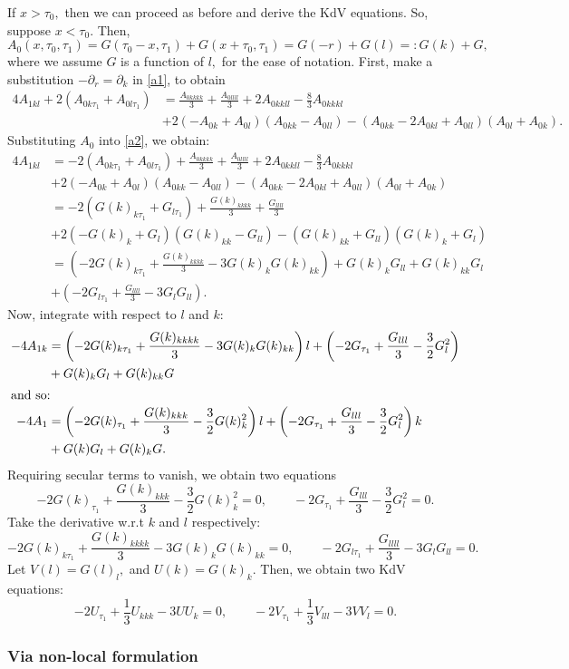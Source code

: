 \documentclass[10pt,reqno,oneside,a4paper]{article}
\begin{document}
If $x > \tau_0,$ then we can proceed as before and derive the KdV equations. So, suppose $x < \tau_0.$ Then, 
\[A_0(x, \tau_0, \tau_1) = G(\tau_0- x, \tau_1) + G(x+\tau_0, \tau_1) = G(-r) + G(l) =: G(k) + G,\]
where we assume $G$ is a function of $l,$ for the ease of notation. First, make a substitution $- \partial_r = \partial_k$ in \eqref{a1}, to obtain 
\begin{equation}\label{a2}
\begin{aligned}
4A_{1kl}  + 2(A_{0 k\tau_{1}} + A_{0l\tau_1}) &= \frac{A_{0kkkk}}{3} + \frac{A_{0llll}}{3} + 2A_{0kkll} -\frac{8}{3}A_{0kkkl} \\
&+ 2(-A_{0k} +  A_{0l})(A_{0kk} - A_{0ll}) - (A_{0kk} - 2A_{0kl} + A_{0ll})(A_{0l} + A_{0k}). 
\end{aligned}
\end{equation}
Substituting $A_0$ into \eqref{a2}, we obtain:
\begin{align*}
4A_{1kl} &= -2(A_{0 k\tau_{1}} + A_{0l\tau_1}) + \frac{A_{0kkkk}}{3} + \frac{A_{0llll}}{3} + 2A_{0kkll} -\frac{8}{3}A_{0kkkl} \\
&+ 2(-A_{0k} +  A_{0l})(A_{0kk} - A_{0ll}) - (A_{0kk} - 2A_{0kl} + A_{0ll})(A_{0l} + A_{0k}) \\
&= - 2(G(k)_{k\tau_{1}} + G_{l\tau_{1}}) + \frac{G(k)_{kkkk}}{3} + \frac{G_{llll}}{3}  \\
&+ 2\left(-G(k)_k + G_l\right)\left(G(k)_{kk} - G_{ll}\right) - \left( G(k)_{kk} + G_{ll}\right)\left(G(k)_k + G_l\right) \\
&= (-2G(k)_{k\tau_{1}} + \frac{G(k)_{kkkk}}{3} - 3G(k)_kG(k)_{kk}) +G(k)_kG_{ll} + G(k)_{kk}G_l \\
&+ (-2G_{l\tau_{1}} + \frac{G_{llll}}{3} - 3G_l G_{ll}).
\end{align*}
Now, integrate with respect to $l$ and $k$:
\begin{align*}
-4A_{1k} &= \left(-2G(k)_{k\tau_{1}} + \frac{G(k)_{kkkk}}{3} - 3G(k)_kG(k)_{kk}\right)l + \left(-2G_{\tau_{1}} + \frac{G_{lll}}{3} - \frac{3}{2}G_l^2\right) \\
&+ G(k)_kG_{l} + G(k)_{kk}G \\
\intertext{and so:}
-4A_{1} &=  \left(-2G(k)_{\tau_{1}} + \frac{G(k)_{kkk}}{3} - \frac{3}{2}G(k)_k^2 \right)l + \left(-2G_{\tau_{1}} + \frac{G_{lll}}{3} - \frac{3}{2}G_l^2\right)k \\
&+ G(k)G_{l} + G(k)_{k}G .
\end{align*} 
Requiring secular terms to vanish, we obtain two equations
\[ -2G(k)_{\tau_{1}} + \frac{G(k)_{kkk}}{3} - \frac{3}{2}G(k)_k^2 = 0, \qquad -2G_{\tau_{1}} + \frac{G_{lll}}{3} - \frac{3}{2}G_l^2 = 0. \]
Take the derivative w.r.t $k$ and $l$ respectively:
\[ -2G(k)_{k\tau_{1}} + \frac{G(k)_{kkkk}}{3} - 3G(k)_kG(k)_{kk}= 0, \qquad -2G_{l\tau_{1}} + \frac{G_{llll}}{3} - 3G_lG_{ll} = 0. \]
Let $V(l) = G(l)_l,$ and $U(k) = G(k)_k.$ Then, we obtain two KdV equations:
\[ 
-2U_{\tau_{1}} + \frac{1}{3}U_{kkk} - 3UU_k= 0, \qquad -2V_{\tau_1} + \frac{1}{3}V_{lll} - 3VV_l = 0.
\]
\subsubsection{Via non-local formulation}



{\small}
\end{document}
